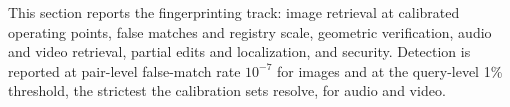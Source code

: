 This section reports the fingerprinting track: image retrieval at calibrated operating points, false matches and registry scale, geometric verification, audio and video retrieval, partial edits and localization, and security. Detection is reported at pair-level false-match rate $10^{-7}$ for images and at the query-level 1\% threshold, the strictest the calibration sets resolve, for audio and video.

